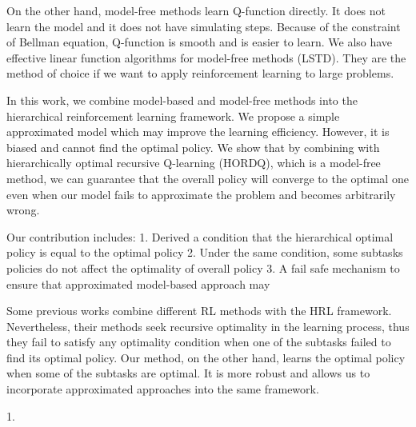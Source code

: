 \documentclass{article} %
\begin{document}
On the other hand, model-free methods learn Q-function directly. It does not 
learn the model and it does not have simulating steps. Because of the 
constraint of Bellman equation, Q-function is smooth and is easier to learn. 
We also have effective linear function algorithms for model-free methods (LSTD).
They are the method of choice if we want to apply reinforcement learning 
to large problems.

In this work, we combine model-based and model-free methods into the hierarchical 
reinforcement learning framework. We propose a simple approximated model which 
may improve the learning efficiency. However, it is biased and cannot find the optimal 
policy. We show that by combining with 
hierarchically optimal recursive Q-learning (HORDQ), which is a model-free method, we can 
guarantee that the overall policy will converge to the optimal one even when our model
fails to approximate the problem and becomes arbitrarily wrong. 

Our contribution includes: 
1. Derived a condition that the hierarchical optimal policy is equal to the optimal policy
2. Under the same condition, some subtasks policies do not affect the optimality of overall policy
3. A fail safe mechanism to ensure that approximated model-based approach may

Some previous works combine different RL methods with the HRL framework.  
Nevertheless, their methods seek recursive optimality in the learning process, 
thus they fail to satisfy any optimality condition when one of the subtasks
failed to find its optimal policy.
Our method, on the other hand, learns the optimal policy when some of the subtasks
are optimal. It is more robust and allows us to incorporate approximated
approaches into the same framework.

1.




\end{document}
